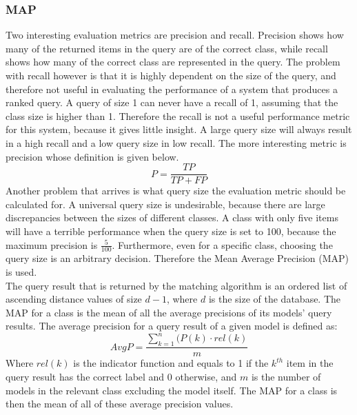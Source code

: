 \documentclass{bigdata}
\begin{document}
\subsubsection{MAP}
Two interesting evaluation metrics are precision and recall. Precision shows how many of the returned items in the query are of the correct class, while recall shows how many of the correct class are represented in the query. The problem with recall however is that it is highly dependent on the size of the query, and therefore not useful in evaluating the performance of a system that produces a ranked query. A query of size 1 can never have a recall of 1, assuming that the class size is higher than 1. Therefore the recall is not a useful performance metric for this system, because it gives little insight. A large query size will always result in a high recall and a low query size in low recall. The more interesting metric is precision whose definition is given below.
\begin{equation}
P = \frac{TP}{TP+FP}
\end{equation}
Another problem that arrives is what query size the evaluation metric should be calculated for. A universal query size is undesirable, because there are large discrepancies between the sizes of different classes. A class with only five items will have a terrible performance when the query size is set to 100, because the maximum precision is $\frac{5}{100}$. Furthermore, even for a specific class, choosing the query size is an arbitrary decision. Therefore the Mean Average Precision (MAP) is used.\\
The query result that is returned by the matching algorithm is an ordered list of ascending distance values of size $d - 1$, where $d$ is the size of the database. The MAP for a class is the mean of all the average precisions of its models' query results. The average precision for a query result of a given model is defined as:
\begin{equation}
AvgP = \frac{\sum_{k=1}^{n}(P(k) \cdot rel(k)}{m}
\end{equation}
Where $rel(k)$ is the indicator function and equals to 1 if the $k^{th}$ item in the query result has the correct label and 0 otherwise, and $m$ is the number of models in the relevant class excluding the model itself. The MAP for a class is then the mean of all of these average precision values.\\
\end{document}
